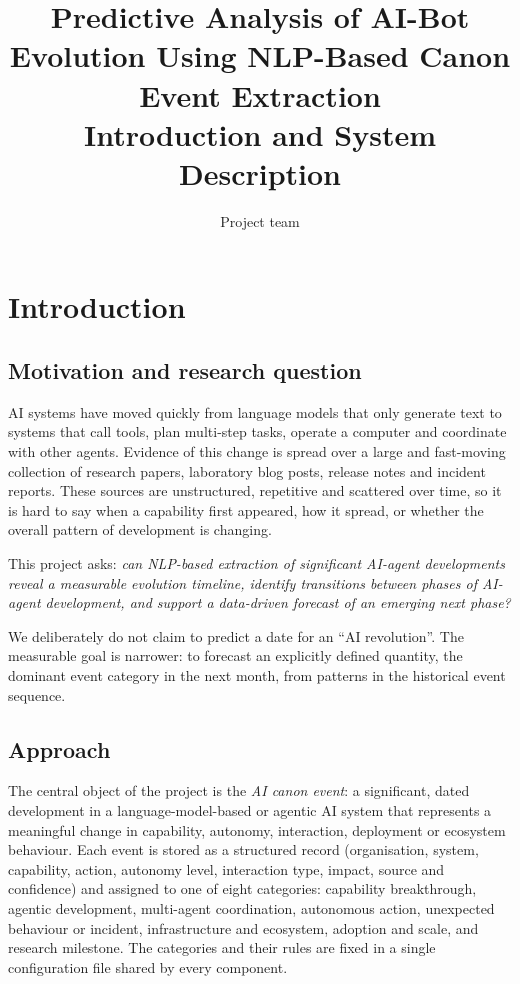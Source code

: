 \documentclass[11pt,a4paper]{article}
\title{Predictive Analysis of AI-Bot Evolution Using NLP-Based Canon Event Extraction\\[0.3em]
\large Introduction and System Description}
\author{Project team}
\date{}
\begin{document}
\maketitle

\section{Introduction}
\label{sec:intro}

\subsection{Motivation and research question}
AI systems have moved quickly from language models that only generate text to systems that call tools, plan
multi-step tasks, operate a computer and coordinate with other agents. Evidence of this change is spread over a
large and fast-moving collection of research papers, laboratory blog posts, release notes and incident reports.
These sources are unstructured, repetitive and scattered over time, so it is hard to say when a capability
first appeared, how it spread, or whether the overall pattern of development is changing.

This project asks: \emph{can NLP-based extraction of significant AI-agent developments reveal a measurable
evolution timeline, identify transitions between phases of AI-agent development, and support a data-driven
forecast of an emerging next phase?}

We deliberately do not claim to predict a date for an ``AI revolution''. The measurable goal is narrower: to
forecast an explicitly defined quantity, the dominant event category in the next month, from patterns in the
historical event sequence.

\subsection{Approach}
The central object of the project is the \emph{AI canon event}: a significant, dated development in a
language-model-based or agentic AI system that represents a meaningful change in capability, autonomy,
interaction, deployment or ecosystem behaviour. Each event is stored as a structured record (organisation,
system, capability, action, autonomy level, interaction type, impact, source and confidence) and assigned to one
of eight categories: capability breakthrough, agentic development, multi-agent coordination, autonomous action,
unexpected behaviour or incident, infrastructure and ecosystem, adoption and scale, and research milestone.
The categories and their rules are fixed in a single configuration file shared by every component.
\end{document}
